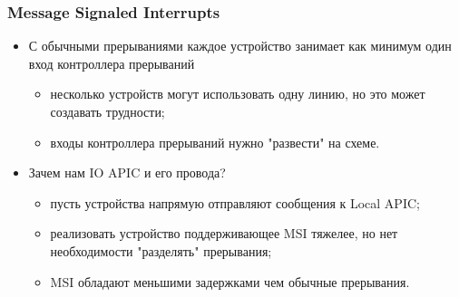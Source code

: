 \begin{frame}
\frametitle{Message Signaled Interrupts}
\begin{itemize}
  \item С обычными прерываниями каждое устройство занимает как минимум один вход
  контроллера прерываний
  \begin{itemize}
    \item несколько устройств могут использовать одну линию, но это может
    создавать трудности;
    \item входы контроллера прерываний нужно "развести" на схеме.
  \end{itemize}
  \item Зачем нам IO APIC и его провода?
  \begin{itemize}
    \item пусть устройства напрямую отправляют сообщения к Local APIC;
    \item реализовать устройство поддерживающее MSI тяжелее, но нет
    необходимости "разделять" прерывания;
    \item MSI обладают меньшими задержками чем обычные прерывания.
  \end{itemize}
\end{itemize}
\end{frame}
